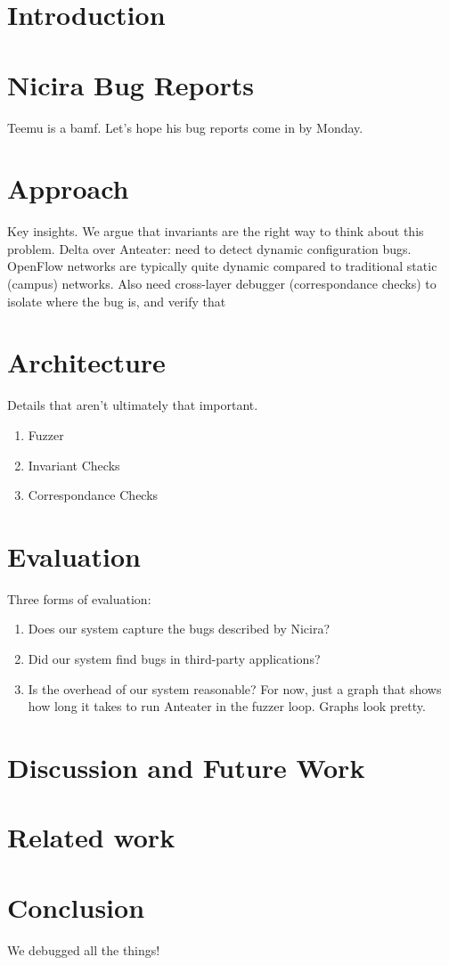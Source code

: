 \documentclass{sig-alternate-10pt}
\begin{document}
\section{Introduction}
    \label{sec:intro}
    

\section{Nicira Bug Reports}

Teemu is a bamf. Let's hope his bug reports come in by Monday.

\section{Approach}

Key insights. We argue that invariants are the right way to think about this
problem. Delta over Anteater: need to detect dynamic configuration bugs.
OpenFlow networks are typically quite dynamic compared to traditional static
(campus) networks. Also need cross-layer debugger (correspondance checks) to isolate where the bug is,
and verify that

\section{Architecture}

Details that aren't ultimately that important.

\begin{enumerate}
\item Fuzzer
\item Invariant Checks
\item Correspondance Checks
\end{enumerate}

\section{Evaluation}

Three forms of evaluation:

\begin{enumerate}
\item Does our system capture the bugs described by Nicira?
\item Did our system find bugs in third-party applications?
\item Is the overhead of our system reasonable? For now, just a graph that
shows how long it takes to run Anteater in the fuzzer loop. Graphs look
pretty.
\end{enumerate}

\section{Discussion and Future Work}
\label{sec:future_work}


\section{Related work}
\label{sec:related_work}


\section{Conclusion}

We debugged all the things!




%
\end{document}
